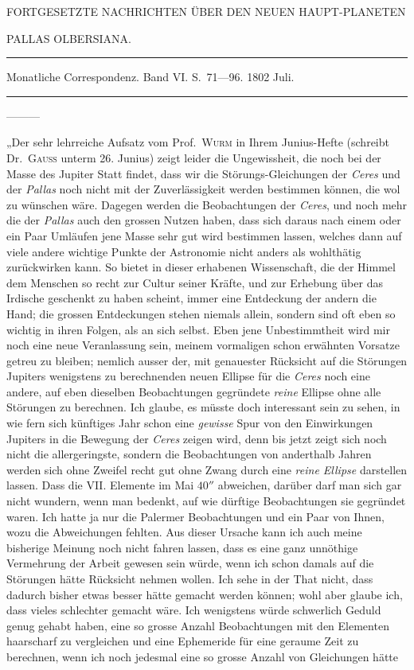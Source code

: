 %
\bigskip{}
\begin{center}
{\small FORTGESETZTE NACHRICHTEN ÜBER DEN NEUEN HAUPT-PLANETEN\par}
PALLAS OLBERSIANA.\par
\medskip\hrule\medskip
Monatliche Correspondenz. Band VI. S.\ 71—96. 1802 Juli.\par
\medskip\hrule
\end{center}\medskip
—\quad —\quad —

„Der sehr lehrreiche Aufsatz vom Prof.\ \textsc{Wurm} in Ihrem Junius-Hefte (schreibt Dr.\ \textsc{Gauss} unterm 26. Junius) zeigt leider die Ungewissheit, die noch bei der Masse des Jupiter Statt findet, dass wir die Störungs-Gleichungen der \textit{Ceres} und der \textit{Pallas} noch nicht mit der Zuverlässigkeit werden bestimmen können, die wol zu wünschen wäre. Dagegen werden die Beobachtungen der \textit{Ceres}, und noch mehr die der \textit{Pallas} auch den grossen Nutzen haben, dass sich daraus nach einem oder ein Paar Umläufen jene Masse sehr gut wird bestimmen lassen, welches dann auf viele andere wichtige Punkte der Astronomie nicht anders als wohlthätig zurückwirken kann. So bietet in dieser erhabenen Wissenschaft, die der Himmel dem Menschen so recht zur Cultur seiner Kräfte, und zur Erhebung über das Irdische geschenkt zu haben scheint, immer eine Entdeckung der andern die Hand; die grossen Entdeckungen stehen niemals allein, sondern sind oft eben so wichtig in ihren Folgen, als an sich selbst. Eben jene Unbestimmtheit wird mir noch eine neue Veranlassung sein, meinem vormaligen schon erwähnten Vorsatze getreu zu bleiben; nemlich ausser der, mit genauester Rücksicht auf die Störungen Jupiters wenigstens zu berechnenden neuen Ellipse für die \textit{Ceres} noch eine andere, auf eben dieselben Beobachtungen gegründete \textit{reine} Ellipse ohne alle Störungen zu berechnen. Ich glaube, es müsste doch interessant sein zu sehen, in wie fern sich künftiges Jahr schon eine \textit{gewisse} Spur von den Einwirkungen Jupiters in die Bewegung der \textit{Ceres} zeigen wird, denn bis jetzt zeigt sich noch nicht die allergeringste, sondern die Beobachtungen von anderthalb Jahren werden sich ohne Zweifel recht gut ohne Zwang durch eine \textit{reine Ellipse} darstellen lassen. Dass die VII. Elemente im Mai $40''$ abweichen, darüber darf man sich gar nicht wundern, wenn man bedenkt, auf wie dürftige Beobachtungen sie gegründet waren. Ich hatte ja nur die Palermer Beobachtungen und ein Paar von Ihnen, wozu die Abweichungen fehlten. Aus dieser Ursache kann ich auch meine bisherige Meinung noch nicht fahren lassen, dass es eine ganz unnöthige Vermehrung der Arbeit gewesen sein würde, wenn ich schon damals auf die Störungen hätte Rücksicht nehmen wollen. Ich sehe in der That nicht, dass dadurch bisher etwas besser hätte gemacht werden können; wohl aber glaube ich, dass vieles schlechter gemacht wäre. Ich wenigstens würde schwerlich Geduld genug gehabt haben, eine so grosse Anzahl Beobachtungen mit den Elementen haarscharf zu vergleichen und eine Ephemeride für eine geraume Zeit zu berechnen, wenn ich noch jedesmal eine so grosse Anzahl von Gleichungen hätte 